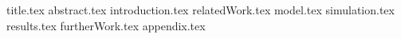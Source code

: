 \documentclass[11pt]{llncs}
\begin{document}
{title.tex}
\thispagestyle{plain}
{abstract.tex}
{introduction.tex}
{relatedWork.tex}
{model.tex}
{simulation.tex}
{results.tex}
{furtherWork.tex}
{appendix.tex}

\end{document}

